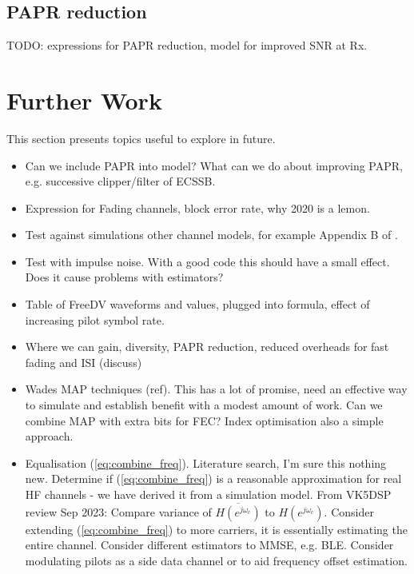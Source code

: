 \documentclass{article}
\begin{document}
\subsection{PAPR reduction}

TODO: expressions for PAPR reduction, model for improved SNR at Rx.

\section{Further Work}

This section presents topics useful to explore in future.

\begin{itemize}
\item Can we include PAPR into model?  What can we do about improving PAPR, e.g. successive clipper/filter of ECSSB.
\item Expression for Fading channels, block error rate, why 2020 is a lemon.
\item Test against simulations other channel models, for example Appendix B of \cite{etsi201}.
\item Test with impulse noise.  With a good code this should have a small effect.  Does it cause problems with estimators?
\item Table of FreeDV waveforms and values, plugged into formula, effect of increasing pilot symbol rate.
\item Where we can gain, diversity, PAPR reduction, reduced overheads for fast fading and ISI (discuss)
\item Wades MAP techniques (ref).  This has a lot of promise, need an effective way to simulate and establish benefit with a modest amount of work.  Can we combine MAP with extra bits for FEC?  Index optimisation also a simple approach.
\item Equalisation (\ref{eq:combine_freq}). Literature search, I'm sure this nothing new. Determine if (\ref{eq:combine_freq}) is a reasonable approximation for real HF channels - we have derived it from a simulation model.  From VK5DSP review Sep 2023: Compare variance of $\overline{H(e^{j \omega_c})}$ to $H(e^{j \omega_c})$. Consider extending (\ref{eq:combine_freq}) to more carriers, it is essentially estimating the entire channel.  Consider different estimators to MMSE, e.g. BLE. Consider modulating pilots as a side data channel or to aid frequency offset estimation.
\end{itemize} 

\nocite{*}


\end{document}
